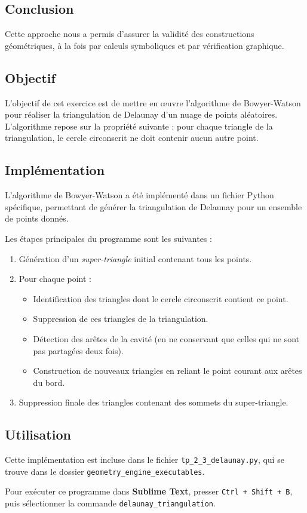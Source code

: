 \documentclass[a4paper,12pt]{article}
\begin{document}
\subsection*{Conclusion}

Cette approche nous a permis d’assurer la validité des constructions géométriques, à la fois par calculs symboliques et par vérification graphique.



\subsection*{Objectif}

L'objectif de cet exercice est de mettre en œuvre l'algorithme de Bowyer-Watson pour réaliser la triangulation de Delaunay d’un nuage de points aléatoires. L'algorithme repose sur la propriété suivante : pour chaque triangle de la triangulation, le cercle circonscrit ne doit contenir aucun autre point.

\subsection*{Implémentation}

L'algorithme de Bowyer-Watson a été implémenté dans un fichier Python spécifique, permettant de générer la triangulation de Delaunay pour un ensemble de points donnés. 

Les étapes principales du programme sont les suivantes :

\begin{enumerate}
    \item Génération d’un \textit{super-triangle} initial contenant tous les points.
    \item Pour chaque point :
    \begin{itemize}
        \item Identification des triangles dont le cercle circonscrit contient ce point.
        \item Suppression de ces triangles de la triangulation.
        \item Détection des arêtes de la cavité (en ne conservant que celles qui ne sont pas partagées deux fois).
        \item Construction de nouveaux triangles en reliant le point courant aux arêtes du bord.
    \end{itemize}
    \item Suppression finale des triangles contenant des sommets du super-triangle.
\end{enumerate}

\subsection*{Utilisation}

Cette implémentation est incluse dans le fichier \texttt{tp\_2\_3\_delaunay.py}, qui se trouve dans le dossier \texttt{geometry\_engine\_executables}.

Pour exécuter ce programme dans \textbf{Sublime Text}, presser \texttt{Ctrl + Shift + B}, puis sélectionner la commande \texttt{delaunay\_triangulation}.
\end{document}
